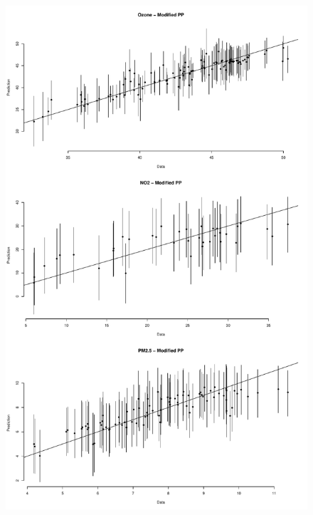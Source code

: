 \documentclass[12pt]{article}
\begin{document}
\begin{figure}[ht]
\begin{center}
\includegraphics[scale=0.5]{figs/fit.pdf}
\end{center}
\end{figure}
\end{document}
